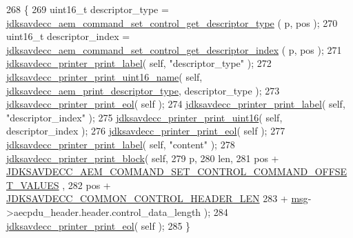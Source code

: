 \begin{DoxyCode}
268 \{
269     uint16\_t descriptor\_type = 
      \hyperlink{group__command__set__control_ga65732c036039042631d50df57dc332fe}{jdksavdecc\_aem\_command\_set\_control\_get\_descriptor\_type}
      ( p, pos );
270     uint16\_t descriptor\_index = 
      \hyperlink{group__command__set__control_gafc0eea5691e5fc876385e663f57e2b40}{jdksavdecc\_aem\_command\_set\_control\_get\_descriptor\_index}
      ( p, pos );
271     \hyperlink{group__util_gaf7818b24143b3c7502926a425a242ff5}{jdksavdecc\_printer\_print\_label}( \textcolor{keyword}{self}, \textcolor{stringliteral}{"descriptor\_type"} );
272     \hyperlink{group__util_ga62486d864a66773d19bbbe23cebf346a}{jdksavdecc\_printer\_print\_uint16\_name}( \textcolor{keyword}{self}, 
      \hyperlink{group__aem__print_gabb4f27bdad61aeaf875d91f408b7199d}{jdksavdecc\_aem\_print\_descriptor\_type}, descriptor\_type );
273     \hyperlink{group__util_gacda56c9d3d24593a52c999682fa6e6e3}{jdksavdecc\_printer\_print\_eol}( \textcolor{keyword}{self} );
274     \hyperlink{group__util_gaf7818b24143b3c7502926a425a242ff5}{jdksavdecc\_printer\_print\_label}( \textcolor{keyword}{self}, \textcolor{stringliteral}{"descriptor\_index"} );
275     \hyperlink{group__util_ga9793e0ff8e7ed25d957282ee6b257ce2}{jdksavdecc\_printer\_print\_uint16}( \textcolor{keyword}{self}, descriptor\_index );
276     \hyperlink{group__util_gacda56c9d3d24593a52c999682fa6e6e3}{jdksavdecc\_printer\_print\_eol}( \textcolor{keyword}{self} );
277     \hyperlink{group__util_gaf7818b24143b3c7502926a425a242ff5}{jdksavdecc\_printer\_print\_label}( \textcolor{keyword}{self}, \textcolor{stringliteral}{"content"} );
278     \hyperlink{group__util_ga18d7b11e396f21996dedde77febcb22f}{jdksavdecc\_printer\_print\_block}( \textcolor{keyword}{self},
279                                     p,
280                                     len,
281                                     pos + 
      \hyperlink{group__command__set__control_gab7e5956990a2540d796470a682a5397e}{JDKSAVDECC\_AEM\_COMMAND\_SET\_CONTROL\_COMMAND\_OFFSET\_VALUES}
      ,
282                                     pos + \hyperlink{group__jdksavdecc__avtp__common__control__header_gaae84052886fb1bb42f3bc5f85b741dff}{JDKSAVDECC\_COMMON\_CONTROL\_HEADER\_LEN}
283                                     + \hyperlink{maap__log__linux_8c_a0c7e58a50354c4a4d6dad428d0e47029}{msg}->aecpdu\_header.header.control\_data\_length );
284     \hyperlink{group__util_gacda56c9d3d24593a52c999682fa6e6e3}{jdksavdecc\_printer\_print\_eol}( \textcolor{keyword}{self} );
285 \}
\end{DoxyCode}


